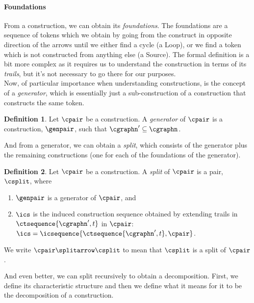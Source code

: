 \documentclass[a4paper]{article}
\theoremstyle{definition}
\newtheorem{definition}{Definition}
\begin{document}
		\paragraph{Foundations} From a construction, we can obtain its \textit{foundations}. The foundations are a sequence of tokens which we obtain by going from the construct in opposite direction of the arrows until we either find a cycle (a Loop), or we find a token which is not constructed from anything else (a Source). The formal definition is a bit more complex as it requires us to understand the construction in terms of its \textit{trails}, but it's not necessary to go there for our purposes.\\

		Now, of particular importance when understanding constructions, is the concept of a \textit{generator}, which is essentially just a sub-construction of a construction that constructs the same token.
		
		\begin{definition}
			Let $\cpair$ be a construction. A \textit{generator} of $\cpair$ is a construction, $\genpair$, such that $\cgraphn'\subseteq \cgraphn$.
		\end{definition}
	
		And from a generator, we can obtain a \textit{split}, which consists of the generator plus the remaining constructions (one for each of the foundations of the generator).
	
		\begin{definition}\label{defn:split}
			Let $\cpair$ be a construction. A \textit{split} of $\cpair$ is a pair, $\csplit$, where
			\begin{enumerate}[itemsep=0pt,topsep=4pt]
				\item $\genpair$ is a generator of $\cpair$, and
				\item $\ics$ is the induced construction sequence obtained by extending trails in $\ctsequence{\cgraphn',t}$ in $\cpair$:  $\ics=\icsequence{\ctsequence{\cgraphn',t},\cpair}$.
			\end{enumerate}
			We write $\cpair\splitarrow \csplit$ to mean that $\csplit$ is a split of $\cpair$.
		\end{definition}
	
		And even better, we can split recursively to obtain a decomposition. First, we define its characteristic structure and then we define what it means for it to be the decomposition of a construction.
	
\end{document}
